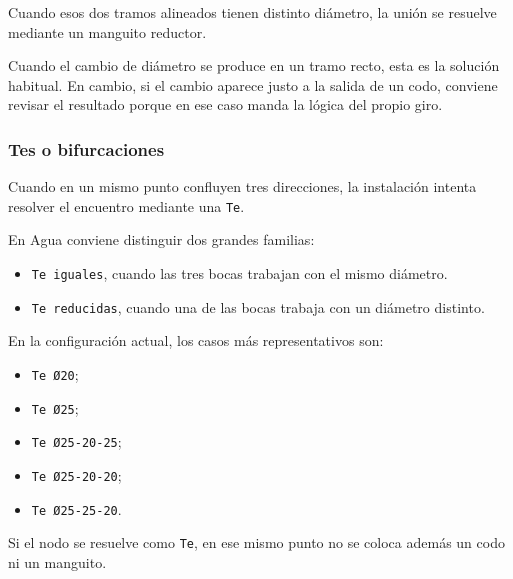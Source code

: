 Cuando esos dos tramos alineados tienen distinto diámetro, la unión se resuelve mediante un manguito reductor.

Cuando el cambio de diámetro se produce en un tramo recto, esta es la solución habitual. En cambio, si el cambio aparece justo a la salida de un codo, conviene revisar el resultado porque en ese caso manda la lógica del propio giro.

\subsubsection{Tes o bifurcaciones}

Cuando en un mismo punto confluyen tres direcciones, la instalación intenta resolver el encuentro mediante una \texttt{Te}.

En Agua conviene distinguir dos grandes familias:

\begin{itemize}
\item \texttt{Te iguales}, cuando las tres bocas trabajan con el mismo diámetro.
\item \texttt{Te reducidas}, cuando una de las bocas trabaja con un diámetro distinto.
\end{itemize}

En la configuración actual, los casos más representativos son:

\begin{itemize}
\item \texttt{Te Ø20};
\item \texttt{Te Ø25};
\item \texttt{Te Ø25-20-25};
\item \texttt{Te Ø25-20-20};
\item \texttt{Te Ø25-25-20}.
\end{itemize}

Si el nodo se resuelve como \texttt{Te}, en ese mismo punto no se coloca además un codo ni un manguito.

